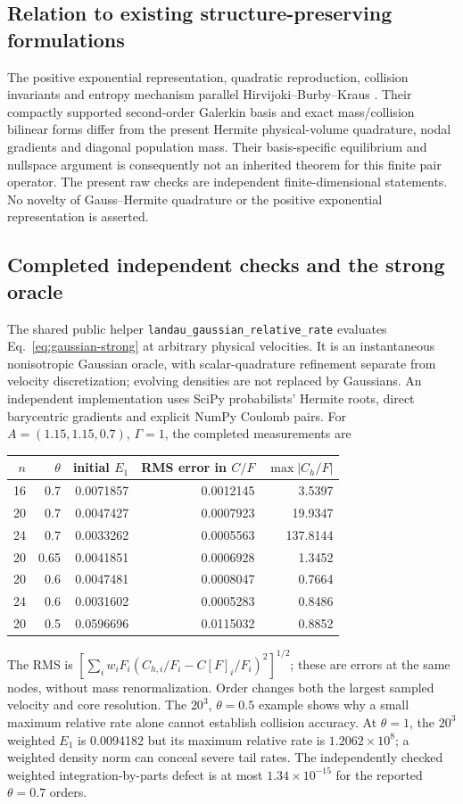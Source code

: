 \documentclass[11pt,letterpaper]{article}
\begin{document}
\subsection{Relation to existing structure-preserving formulations}
The positive exponential representation, quadratic reproduction, collision
invariants and entropy mechanism parallel Hirvijoki--Burby--Kraus
\cite[Eqs.~(7)--(17)]{HBK18}. Their compactly supported second-order Galerkin
basis and exact mass/collision bilinear forms differ from the present Hermite
physical-volume quadrature, nodal gradients and diagonal population mass.
Their basis-specific equilibrium and nullspace argument is consequently not
an inherited theorem for this finite pair operator. The present raw checks
are independent finite-dimensional statements. No novelty of Gauss--Hermite
quadrature or the positive exponential representation is asserted.

\subsection{Completed independent checks and the strong oracle}
The shared public helper \texttt{landau\_gaussian\_relative\_rate} evaluates
Eq.~\eqref{eq:gaussian-strong} at arbitrary physical velocities. It is an
instantaneous nonisotropic Gaussian oracle, with scalar-quadrature refinement
separate from velocity discretization; evolving densities are not replaced
by Gaussians. An independent implementation uses SciPy probabilists' Hermite
roots, direct barycentric gradients and explicit NumPy Coulomb pairs.
For $A=(1.15,1.15,0.7)$, $\Gamma=1$, the completed measurements are
\begin{center}
\begin{tabular}{rrrrr}
$n$ & $\theta$ & initial $E_1$ & RMS error in $C/F$ & $\max|C_h/F|$\\
\hline
16 & 0.7 & 0.0071857 & 0.0012145 & 3.5397\\
20 & 0.7 & 0.0047427 & 0.0007923 & 19.9347\\
24 & 0.7 & 0.0033262 & 0.0005563 & 137.8144\\
20 & 0.65 & 0.0041851 & 0.0006928 & 1.3452\\
20 & 0.6 & 0.0047481 & 0.0008047 & 0.7664\\
24 & 0.6 & 0.0031602 & 0.0005283 & 0.8486\\
20 & 0.5 & 0.0596696 & 0.0115032 & 0.8852
\end{tabular}
\end{center}
The RMS is $[\sum_iw_iF_i(C_{h,i}/F_i-C[F]_i/F_i)^2]^{1/2}$;
these are errors at the same nodes, without mass renormalization.
Order changes both the largest sampled velocity and core resolution.
The $20^3$, $\theta=0.5$ example shows why a small maximum relative rate
alone cannot establish collision accuracy. At $\theta=1$, the $20^3$
weighted $E_1$ is 0.0094182 but its maximum relative rate is
$1.2062\times10^8$; a weighted density norm can conceal severe tail rates.
The independently checked weighted integration-by-parts defect is at most
$1.34\times10^{-15}$ for the reported $\theta=0.7$ orders.
\end{document}
